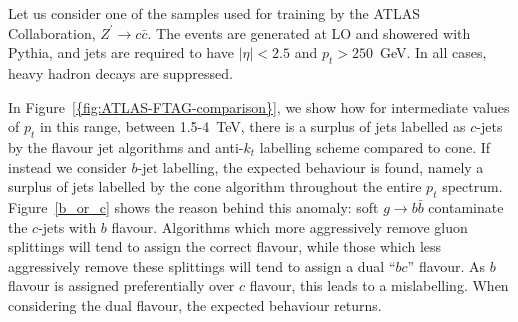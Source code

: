 \documentclass[10pt,a4paper]{book}
\begin{document}
Let us consider one of the samples used for training by the ATLAS Collaboration, $Z^\prime \rightarrow c\bar{c}$. The events are generated at LO and showered with Pythia, and jets are required to have $\vert \eta \vert < 2.5$ and $p_t > 250$~GeV. In all cases, heavy hadron decays are suppressed. 

In Figure~\ref{{fig:ATLAS-FTAG-comparison}}, we show how for intermediate values of $p_t$ in this range, between 1.5-4~TeV, there is a surplus of jets labelled as $c$-jets by the flavour jet algorithms and anti-$k_t$ labelling scheme compared to cone. If instead we consider $b$-jet labelling, the expected behaviour is found, namely a surplus of jets labelled by the cone algorithm throughout the entire $p_t$ spectrum. Figure~\ref{b_or_c} shows the reason behind this anomaly: soft  $g \rightarrow b\bar{b}$ contaminate the $c$-jets with $b$ flavour. Algorithms which more aggressively remove gluon splittings will tend to assign the correct flavour, while those which less aggressively remove these splittings will tend to assign a dual ``$bc$'' flavour. As $b$ flavour is assigned preferentially over $c$ flavour, this leads to a mislabelling. When considering the dual flavour, the expected behaviour returns.
\end{document}
